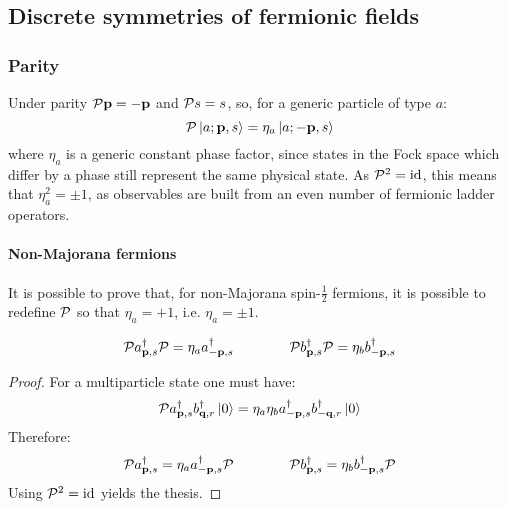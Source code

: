 \subsection{Discrete symmetries of fermionic fields}

\subsubsection{Parity}

Under parity $ \mathcal{P} \mathbf{p} = - \mathbf{p} $ and $ \mathcal{P} s = s $, so, for a generic particle of type $ a $:
\begin{equation}
  \mathcal{P} \ket{a; \mathbf{p},s} = \eta_a \ket{a; -\mathbf{p},s}
\end{equation}
where $ \eta_a $ is a generic constant phase factor, since states in the Fock space which differ by a phase still represent the same physical state. As $ \mathcal{P}^2 = \operatorname{id} $, this means that $ \eta_a^2 = \pm 1 $, as observables are built from an even number of fermionic ladder operators.

\paragraph{Non-Majorana fermions}

It is possible to prove that, for non-Majorana spin-$ \frac{1}{2} $ fermions, it is possible to redefine $ \mathcal{P} $ so that $ \eta_a = +1 $, i.e. $ \eta_a = \pm 1 $.

\begin{proposition}[before upper = {\tcbtitle}]{}{}
  \begin{equation}
    \mathcal{P} a_{\mathbf{p},s}^\dagger \mathcal{P} = \eta_a a_{-\mathbf{p},s}^\dagger
    \qquad \qquad
    \mathcal{P} b_{\mathbf{p},s}^\dagger \mathcal{P} = \eta_b b_{-\mathbf{p},s}^\dagger
    \label{eq:parity-op}
  \end{equation}
\end{proposition}

\begin{proofbox}
  \begin{proof}
    For a multiparticle state one must have:
    \begin{equation*}
      \mathcal{P} a_{\mathbf{p},s}^\dagger b_{\mathbf{q},r}^\dagger \ket{0} = \eta_a \eta_b a_{-\mathbf{p},s}^\dagger b_{-\mathbf{q},r}^\dagger \ket{0}
    \end{equation*}
    Therefore:
    \begin{equation*}
      \mathcal{P} a_{\mathbf{p},s}^\dagger = \eta_a a_{-\mathbf{p},s}^\dagger \mathcal{P}
      \qquad \qquad
      \mathcal{P} b_{\mathbf{p},s}^\dagger = \eta_b b_{-\mathbf{p},s}^\dagger \mathcal{P}
    \end{equation*}
    Using $ \mathcal{P}^2 = \operatorname{id} $ yields the thesis.
  \end{proof}
\end{proofbox}

